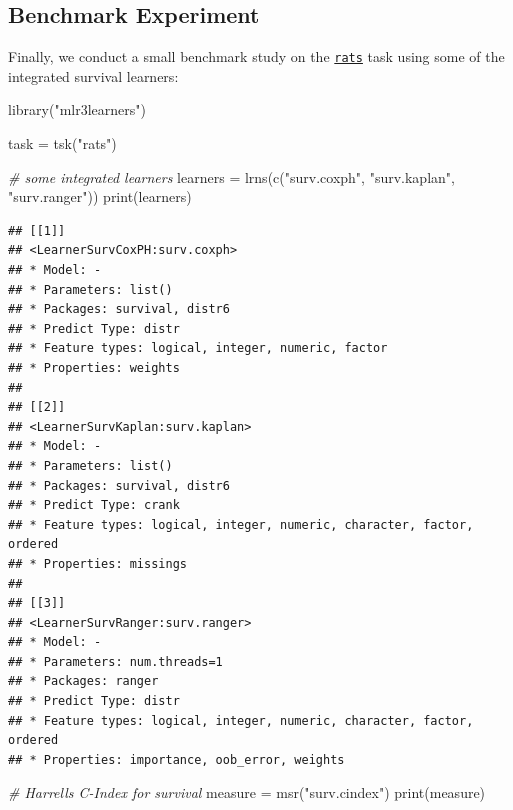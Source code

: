 \documentclass[
]{scrbook}
\newenvironment{Shaded}{\begin{snugshade}}{\end{snugshade}}
\newcommand{\CommentTok}[1]{\textcolor[rgb]{0.56,0.35,0.01}{\textit{#1}}}
\newcommand{\FunctionTok}[1]{\textcolor[rgb]{0.00,0.00,0.00}{#1}}
\newcommand{\NormalTok}[1]{#1}
\newcommand{\OtherTok}[1]{\textcolor[rgb]{0.56,0.35,0.01}{#1}}
\newcommand{\StringTok}[1]{\textcolor[rgb]{0.31,0.60,0.02}{#1}}
\renewenvironment{Shaded} {\begin{snugshade}\small} {\end{snugshade}}
\begin{document}
\hypertarget{benchmark-experiment}{%
\subsection{Benchmark Experiment}\label{benchmark-experiment}}

Finally, we conduct a small benchmark study on the \href{https://mlr3proba.mlr-org.com/reference/mlr_tasks_rats.html}{\texttt{rats}} task using some of the integrated survival learners:

\begin{Shaded}
\begin{Highlighting}[]
\FunctionTok{library}\NormalTok{(}\StringTok{"mlr3learners"}\NormalTok{)}

\NormalTok{task }\OtherTok{=} \FunctionTok{tsk}\NormalTok{(}\StringTok{"rats"}\NormalTok{)}

\CommentTok{\# some integrated learners}
\NormalTok{learners }\OtherTok{=} \FunctionTok{lrns}\NormalTok{(}\FunctionTok{c}\NormalTok{(}\StringTok{"surv.coxph"}\NormalTok{, }\StringTok{"surv.kaplan"}\NormalTok{, }\StringTok{"surv.ranger"}\NormalTok{))}
\FunctionTok{print}\NormalTok{(learners)}
\end{Highlighting}
\end{Shaded}

\begin{verbatim}
## [[1]]
## <LearnerSurvCoxPH:surv.coxph>
## * Model: -
## * Parameters: list()
## * Packages: survival, distr6
## * Predict Type: distr
## * Feature types: logical, integer, numeric, factor
## * Properties: weights
## 
## [[2]]
## <LearnerSurvKaplan:surv.kaplan>
## * Model: -
## * Parameters: list()
## * Packages: survival, distr6
## * Predict Type: crank
## * Feature types: logical, integer, numeric, character, factor, ordered
## * Properties: missings
## 
## [[3]]
## <LearnerSurvRanger:surv.ranger>
## * Model: -
## * Parameters: num.threads=1
## * Packages: ranger
## * Predict Type: distr
## * Feature types: logical, integer, numeric, character, factor, ordered
## * Properties: importance, oob_error, weights
\end{verbatim}

\begin{Shaded}
\begin{Highlighting}[]
\CommentTok{\# Harrell\textquotesingle{}s C{-}Index for survival}
\NormalTok{measure }\OtherTok{=} \FunctionTok{msr}\NormalTok{(}\StringTok{"surv.cindex"}\NormalTok{)}
\FunctionTok{print}\NormalTok{(measure)}
\end{Highlighting}
\end{Shaded}
\end{document}
